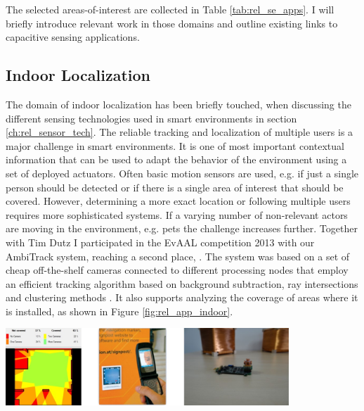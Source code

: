 The selected areas-of-interest are collected in Table \ref{tab:rel_se_apps}. I will briefly introduce relevant work in those domains and outline existing links to capacitive sensing applications. 

\subsection{Indoor Localization}
The domain of indoor localization has been briefly touched, when discussing the different sensing technologies used in smart environments in section \ref{ch:rel_sensor_tech}. The reliable tracking and localization of multiple users is a major challenge in smart environments. It is one of most important contextual information that can be used to adapt the behavior of the environment using a set of deployed actuators. Often basic motion sensors are used, e.g. if just a single person should be detected or if there is a single area of interest that should be covered. However, determining a more exact location or following multiple users requires more sophisticated systems. If a varying number of non-relevant actors are moving in the environment, e.g. pets the challenge increases further. Together with Tim Dutz I participated in the EvAAL competition 2013 with our AmbiTrack system, reaching a second place, \cite{braun2013ambitrack}. The system was based on a set of cheap off-the-shelf cameras connected to different processing nodes that employ an efficient tracking algorithm based on background subtraction, ray intersections and clustering methods \cite{Braun2013MarkerFree}. It also supports analyzing the coverage of areas where it is installed, as shown in Figure \ref{fig:rel_app_indoor}.

\begin{minipage}{\linewidth}
\centering
\includegraphics[width=0.8\textwidth]{images/rel_app_indoor}
\label{fig:rel_app_indoor}
\end{minipage}	


